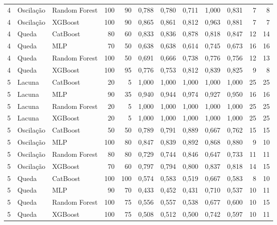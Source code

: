 \begin{longtable}{@{}rllrrrrrrrrr@{}}
4 & Oscilação & Random Forest & 100 & 90 & 0,788 & 0,780 & 0,711 & 1,000 & 0,831 & 7 & 8 \\
4 & Oscilação & XGBoost & 100 & 90 & 0,865 & 0,861 & 0,812 & 0,963 & 0,881 & 7 & 7 \\
4 & Queda & CatBoost & 80 & 60 & 0,833 & 0,836 & 0,878 & 0,818 & 0,847 & 12 & 14 \\
4 & Queda & MLP & 70 & 50 & 0,638 & 0,638 & 0,614 & 0,745 & 0,673 & 16 & 16 \\
4 & Queda & Random Forest & 100 & 50 & 0,691 & 0,666 & 0,738 & 0,776 & 0,756 & 12 & 13 \\
4 & Queda & XGBoost & 100 & 95 & 0,776 & 0,753 & 0,812 & 0,839 & 0,825 & 9 & 8 \\
5 & Lacuna & CatBoost & 20 & 5 & 1,000 & 1,000 & 1,000 & 1,000 & 1,000 & 25 & 25 \\
5 & Lacuna & MLP & 90 & 35 & 0,940 & 0,944 & 0,974 & 0,927 & 0,950 & 16 & 16 \\
5 & Lacuna & Random Forest & 20 & 5 & 1,000 & 1,000 & 1,000 & 1,000 & 1,000 & 25 & 25 \\
5 & Lacuna & XGBoost & 20 & 5 & 1,000 & 1,000 & 1,000 & 1,000 & 1,000 & 25 & 25 \\
5 & Oscilação & CatBoost & 50 & 50 & 0,789 & 0,791 & 0,889 & 0,667 & 0,762 & 15 & 15 \\
5 & Oscilação & MLP & 100 & 80 & 0,847 & 0,839 & 0,892 & 0,868 & 0,880 & 9 & 10 \\
5 & Oscilação & Random Forest & 80 & 80 & 0,729 & 0,744 & 0,846 & 0,647 & 0,733 & 11 & 11 \\
5 & Oscilação & XGBoost & 70 & 60 & 0,797 & 0,794 & 0,800 & 0,837 & 0,818 & 14 & 15 \\
5 & Queda & CatBoost & 100 & 100 & 0,574 & 0,583 & 0,519 & 0,667 & 0,583 & 8 & 10 \\
5 & Queda & MLP & 90 & 70 & 0,433 & 0,452 & 0,431 & 0,710 & 0,537 & 10 & 11 \\
5 & Queda & Random Forest & 100 & 75 & 0,556 & 0,557 & 0,538 & 0,677 & 0,600 & 10 & 15 \\
5 & Queda & XGBoost & 100 & 75 & 0,508 & 0,512 & 0,500 & 0,742 & 0,597 & 10 & 11 \\

\end{longtable}
